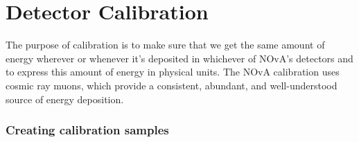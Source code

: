 \section{Detector Calibration}\label{sec:NOvACalibration}




The purpose of calibration is to make sure that we get the same amount of energy wherever or whenever it's deposited in whichever of NOvA's detectors and to express this amount of energy in physical units. The NOvA calibration uses cosmic ray muons, which provide a consistent, abundant, and well-understood source of energy deposition.



\subsubsection*{Creating calibration samples}\label{secCreatingCalibrationSamples}


